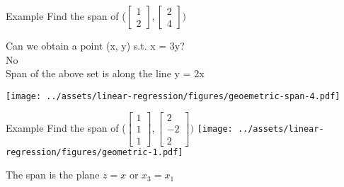 \documentclass{beamer}
\begin{document}
\begin{frame}{Example}
Find the span of ($\begin{bmatrix}
1 \\2
\end{bmatrix}, \begin{bmatrix}
2 \\4
\end{bmatrix}) $

\pause Can we obtain a point (x, y) s.t. x = 3y? \\
\pause No \\ 
\pause Span of the above set is along the line y = 2x

\texttt{[image: ../assets/linear-regression/figures/geoemetric-span-4.pdf]}


\end{frame}

\begin{frame}{Example}
Find the span of ($\begin{bmatrix}
1 \\1\\1
\end{bmatrix}, \begin{bmatrix}
2 \\-2\\2
\end{bmatrix}) $
\pause 
    \texttt{[image: ../assets/linear-regression/figures/geometric-1.pdf]}


\pause The span is the plane $z=x$ or $x_3=x_1$
\end{frame}
\end{document}
